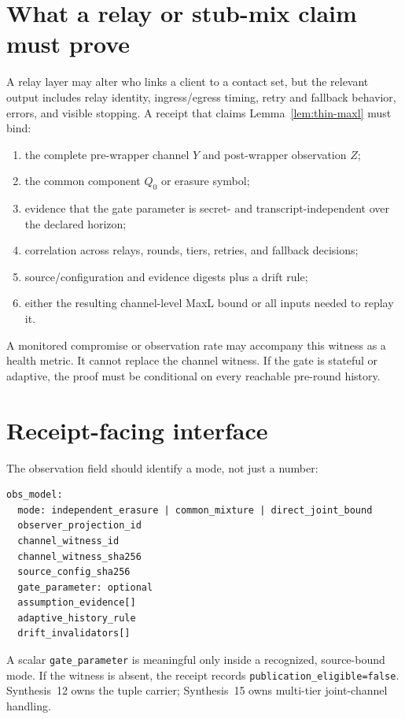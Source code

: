 \documentclass[11pt]{article}
\theoremstyle{definition}
\begin{document}
\section{What a relay or stub-mix claim must prove}\label{sec:relay}
A relay layer may alter who links a client to a contact set, but the relevant output includes relay identity, ingress/egress timing, retry and fallback behavior, errors, and visible stopping. A receipt that claims Lemma~\ref{lem:thin-maxl} must bind:
\begin{enumerate}[leftmargin=*]
\item the complete pre-wrapper channel \(Y\) and post-wrapper observation \(Z\);
\item the common component \(Q_0\) or erasure symbol;
\item evidence that the gate parameter is secret- and transcript-independent over the declared horizon;
\item correlation across relays, rounds, tiers, retries, and fallback decisions;
\item source/configuration and evidence digests plus a drift rule;
\item either the resulting channel-level MaxL bound or all inputs needed to replay it.
\end{enumerate}

A monitored compromise or observation rate may accompany this witness as a health metric. It cannot replace the channel witness. If the gate is stateful or adaptive, the proof must be conditional on every reachable pre-round history.

\section{Receipt-facing interface}\label{sec:receipt}
The observation field should identify a mode, not just a number:
\begin{verbatim}
obs_model:
  mode: independent_erasure | common_mixture | direct_joint_bound
  observer_projection_id
  channel_witness_id
  channel_witness_sha256
  source_config_sha256
  gate_parameter: optional
  assumption_evidence[]
  adaptive_history_rule
  drift_invalidators[]
\end{verbatim}
A scalar \texttt{gate\_parameter} is meaningful only inside a recognized, source-bound mode. If the witness is absent, the receipt records \texttt{publication\_eligible=false}. Synthesis~12 owns the tuple carrier; Synthesis~15 owns multi-tier joint-channel handling.\cite{series:receiptitems,series:tieredobs}
\end{document}
